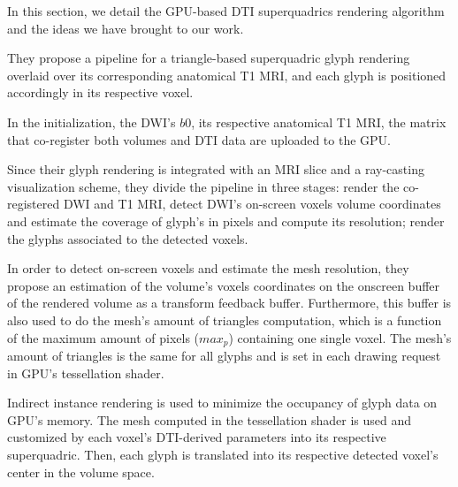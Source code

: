 \documentclass[twoside,twocolumn,10pt]{article}
\begin{document}
In this section, we detail the GPU-based DTI superquadrics rendering algorithm  and the ideas we have brought to our work.

They propose a pipeline for a triangle-based superquadric glyph rendering overlaid over its corresponding anatomical T1 MRI, and each glyph is positioned accordingly in its respective voxel.



In the initialization, the DWI's $b0$, its respective anatomical T1 MRI, the matrix that co-register both volumes and DTI data are uploaded to the GPU. 

Since their glyph rendering is integrated with an MRI slice and a ray-casting visualization scheme, they divide the pipeline in three stages: render the co-registered DWI and T1 MRI, detect DWI's on-screen voxels volume coordinates and estimate the coverage of glyph's in pixels and compute its resolution; render the glyphs associated to the detected voxels. %

In order to detect on-screen voxels and estimate the mesh resolution, they propose an estimation of the volume's voxels coordinates on the onscreen buffer of the rendered volume as a transform feedback buffer. Furthermore, this buffer is also used to do the mesh's amount of triangles computation, which is a function of the maximum amount of pixels ($max_p$) containing one single voxel. The mesh's amount of triangles is the same for all glyphs and is set in each drawing request in GPU's tessellation shader.

Indirect instance rendering is used to minimize the occupancy of glyph data on GPU's memory. The mesh computed in the tessellation shader is used and customized by each voxel's DTI-derived parameters into its respective superquadric. Then, each glyph is translated into its respective detected voxel's center in the volume space.



\end{document}

